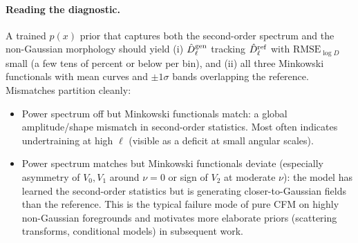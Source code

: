 \documentclass[11pt]{article}
\theoremstyle{definition}
\begin{document}
\paragraph{Reading the diagnostic.}
A trained $p(x)$ prior that captures both the second-order spectrum and
the non-Gaussian morphology should yield (i) $\hat D_\ell^{\rm gen}$
tracking $\hat D_\ell^{\rm ref}$ with $\mathrm{RMSE}_{\log D}$ small (a
few tens of percent or below per bin), and (ii) all three Minkowski
functionals with mean curves and $\pm1\sigma$ bands overlapping the
reference. Mismatches partition cleanly:
\begin{itemize}[leftmargin=2.0em,itemsep=0.15em]
  \item Power spectrum off but Minkowski functionals match: a global
    amplitude/shape mismatch in second-order statistics. Most often
    indicates undertraining at high $\ell$ (visible as a deficit at
    small angular scales).
  \item Power spectrum matches but Minkowski functionals deviate
    (especially asymmetry of $V_0,V_1$ around $\nu=0$ or sign of $V_2$ at
    moderate $\nu$): the model has learned the second-order statistics
    but is generating closer-to-Gaussian fields than the reference. This
    is the typical failure mode of pure CFM on highly non-Gaussian
    foregrounds and motivates more elaborate priors (scattering
    transforms, conditional models) in subsequent work.
\end{itemize}


\pagebreak
\end{document}
